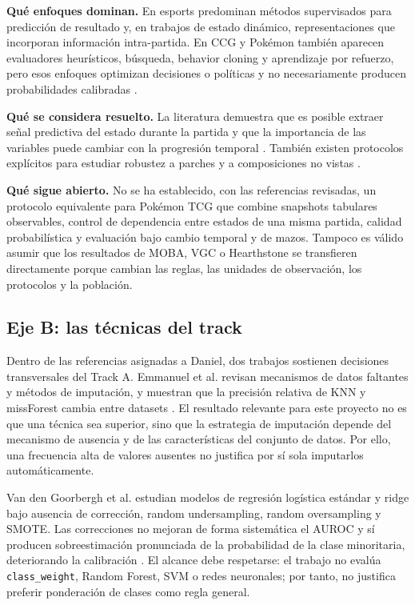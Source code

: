 \noindent\textbf{Qué enfoques dominan.} En esports predominan métodos
supervisados para predicción de resultado y, en trabajos de estado
dinámico, representaciones que incorporan información intra-partida.
En CCG y Pokémon también aparecen evaluadores heurísticos, búsqueda,
behavior cloning y aprendizaje por refuerzo, pero esos enfoques
optimizan decisiones o políticas y no necesariamente producen
probabilidades calibradas \cite{kamal_moba_2025,miernik_evolving_2022,angliss_vgcbench_2026}.

\noindent\textbf{Qué se considera resuelto.} La literatura demuestra
que es posible extraer señal predictiva del estado durante la partida y
que la importancia de las variables puede cambiar con la progresión
temporal \cite{tian_hero_2022,janusz_hearthstone_2017}. También existen
protocolos explícitos para estudiar robustez a parches y a
composiciones no vistas \cite{chitayat_meta_2023,angliss_vgcbench_2026}.

\noindent\textbf{Qué sigue abierto.} No se ha establecido, con las
referencias revisadas, un protocolo equivalente para Pokémon TCG que
combine snapshots tabulares observables, control de dependencia entre
estados de una misma partida, calidad probabilística y evaluación bajo
cambio temporal y de mazos. Tampoco es válido asumir que los resultados
de MOBA, VGC o Hearthstone se transfieren directamente porque cambian
las reglas, las unidades de observación, los protocolos y la población.

\subsection{Eje B: las técnicas del track}
\label{subsec:ejeb}

Dentro de las referencias asignadas a Daniel, dos trabajos sostienen
decisiones transversales del Track A. Emmanuel et al. revisan
mecanismos de datos faltantes y métodos de imputación, y muestran que
la precisión relativa de KNN y missForest cambia entre datasets
\cite{emmanuel_missing_2021}. El resultado relevante para este proyecto
no es que una técnica sea superior, sino que la estrategia de
imputación depende del mecanismo de ausencia y de las características
del conjunto de datos. Por ello, una frecuencia alta de valores
ausentes no justifica por sí sola imputarlos automáticamente.

Van den Goorbergh et al. estudian modelos de regresión logística
estándar y ridge bajo ausencia de corrección, random undersampling,
random oversampling y SMOTE. Las correcciones no mejoran de forma
sistemática el AUROC y sí producen sobreestimación pronunciada de la
probabilidad de la clase minoritaria, deteriorando la calibración
\cite{vandenGoorbergh_imbalance_2022}. El alcance debe respetarse: el
trabajo no evalúa \texttt{class\_weight}, Random Forest, SVM o redes
neuronales; por tanto, no justifica preferir ponderación de clases como
regla general.

